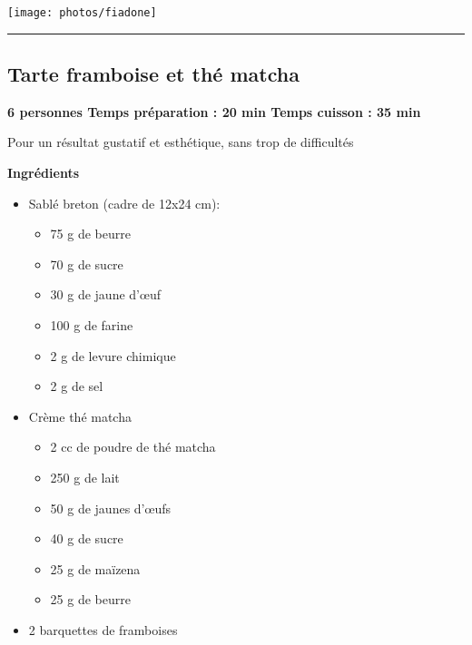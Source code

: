 \documentclass[]{book}
\providecommand{\tightlist}{%
  \setlength{\itemsep}{0pt}\setlength{\parskip}{0pt}}
\begin{document}
\begin{center}\texttt{[image: photos/fiadone]} \end{center}

\begin{center}\rule{0.5\linewidth}{0.5pt}\end{center}

\hypertarget{tarte-framboise-et-thuxe9-matcha}{%
\subsection*{\texorpdfstring{{Tarte framboise et thé matcha}}{Tarte framboise et thé matcha}}\label{tarte-framboise-et-thuxe9-matcha}}

\begin{sucrebox}
\textbf{6 personnes \textbar{} Temps préparation : 20 min \textbar{}
Temps cuisson : 35 min}

Pour un résultat gustatif et esthétique, sans trop de difficultés
\end{sucrebox}

\textbf{Ingrédients}

\begin{itemize}
\tightlist
\item
  Sablé breton (cadre de 12x24 cm):

  \begin{itemize}
  \tightlist
  \item
    75 g de beurre
  \item
    70 g de sucre
  \item
    30 g de jaune d'œuf
  \item
    100 g de farine
  \item
    2 g de levure chimique
  \item
    2 g de sel
  \end{itemize}
\item
  Crème thé matcha

  \begin{itemize}
  \tightlist
  \item
    2 cc de poudre de thé matcha
  \item
    250 g de lait
  \item
    50 g de jaunes d'œufs
  \item
    40 g de sucre
  \item
    25 g de maïzena
  \item
    25 g de beurre
  \end{itemize}
\item
  2 barquettes de framboises
\end{itemize}
\end{document}
